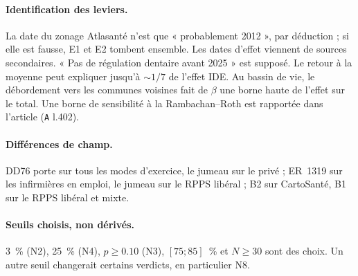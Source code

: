 \paragraph{Identification des leviers.} La date du zonage Atlasanté \citep{atlasante2014zonage}
n'est que « probablement 2012 », par déduction ; si elle est fausse, E1 et E2 tombent ensemble.
Les dates d'effet viennent de sources secondaires. « Pas de régulation dentaire avant 2025 » est
supposé. Le retour à la moyenne peut expliquer jusqu'à $\sim 1/7$\derive{} de l'effet IDE. Au
bassin de vie, le débordement vers les communes voisines fait de $\beta$ une borne haute de
l'effet sur le total. Une borne de sensibilité à la Rambachan--Roth \citep{rambachan2023} est
rapportée dans l'article (\texttt{A} l.402).

\paragraph{Différences de champ.} DD76 porte sur tous les modes d'exercice, le jumeau sur le
privé ; ER~1319 sur les infirmières en emploi, le jumeau sur le RPPS libéral ; B2 sur CartoSanté,
B1 sur le RPPS libéral et mixte.

\paragraph{Seuils choisis, non dérivés.} 3\suppose{}~\% (N2), 25\suppose{}~\% (N4),
$p \ge \num{0.10}$\suppose{} (N3), $[75 ; 85]$\suppose{}~\% et $N \ge 30$\suppose{} sont des
choix. Un autre seuil changerait certains verdicts, en particulier N8.
\endgroup
